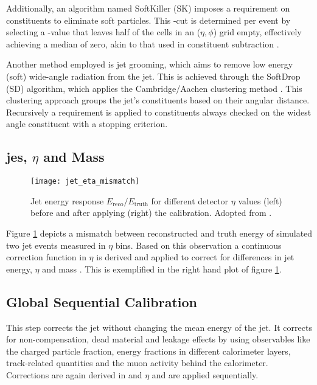 Additionally, an algorithm named SoftKiller (SK) imposes a \pt requirement on constituents to eliminate soft particles. This \pt-cut is determined per event by selecting a \pt-value that leaves half of the cells in an ($\eta,\phi$) grid empty, effectively achieving a median \pt of zero, akin to that used in constituent subtraction \citep{ATLAS-CONF-2017-065}.

Another method employed is jet grooming, which aims to remove low energy (soft) wide-angle radiation from the jet. This is achieved through the SoftDrop (SD) algorithm, which applies the Cambridge/Aachen clustering method \citep{Larkoski_2014}. This clustering approach groups the jet's constituents based on their angular distance. Recursively a \pt requirement is applied to constituents always checked on the widest angle constituent with a stopping criterion. 






\subsection{\ac{jes}, $\eta$ and Mass}
\begin{figure}
  \centering
  \texttt{[image: jet\_eta\_mismatch]}
  \caption[]{Jet energy response $E_\text{reco}/E_\text{truth}$ for different detector $\eta$ values (left) before and after applying (right) the calibration. Adopted from \citep{jet_eta_calib}.}
  \label{fig:jet_eta_mismatch}
\end{figure}
Figure \ref{fig:jet_eta_mismatch} depicts a mismatch between reconstructed and truth energy of simulated two jet events measured in $\eta$ bins. Based on this observation a continuous correction function in $\eta$ is derived and applied to correct for differences in jet energy, $\eta$ and mass \citep{atlas2011jet,Aaboud:2019aa}. This is exemplified in the right hand plot of figure \ref{fig:jet_eta_mismatch}.

\subsection{Global Sequential Calibration}
This step corrects the jet \pt without changing the mean energy of the jet. It corrects for non-compensation, dead material and leakage effects by using observables like the charged particle fraction, energy fractions in different calorimeter layers, track-related quantities and the muon activity behind the calorimeter. Corrections are again derived in \pt and $\eta$ and are applied sequentially.

